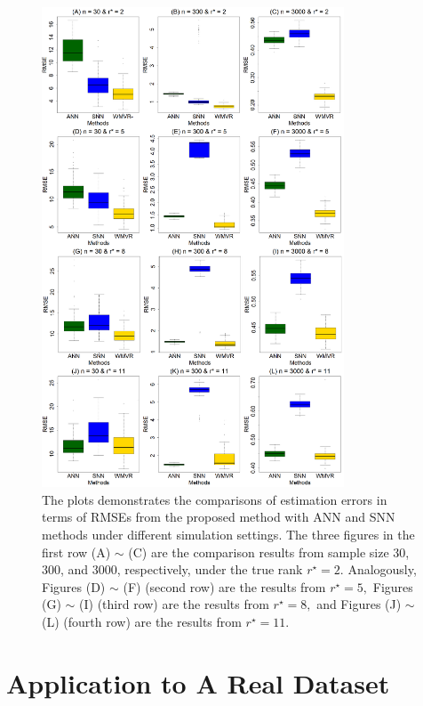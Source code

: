 \documentclass[alpha-refs]{wiley-article}
\begin{document}
\begin{figure}[htbp!]
\includegraphics[width=90mm]{Figure/S5_P1.pdf}
\centering
\caption{The plots demonstrates the comparisons of estimation errors in terms of RMSEs from the proposed method with ANN and SNN methods under different simulation settings. The three figures in the first row (A) $\sim$ (C) are the comparison results from sample size 30, 300, and 3000, respectively, under the true rank $r^{\star} = 2$. Analogously, Figures (D) $\sim$ (F) (second row) are the results from $r^{\star} = 5,$ Figures (G) $\sim$ (I) (third row) are the results from $r^{\star} = 8,$ and Figures (J) $\sim$ (L) (fourth row) are the results from $r^{\star} = 11.$  }
\label{Fig_S4_Ex1}
\end{figure}

\section{Application to A Real Dataset}
\end{document}
